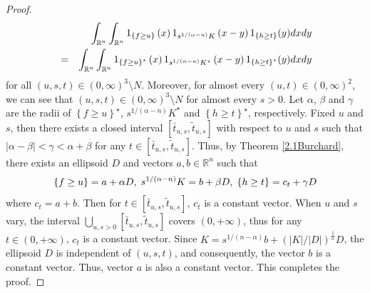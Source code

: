 \documentclass[preprint,12pt]{elsarticle}
\begin{document}
\begin{proof}
\begin{eqnarray}
	&&\int_{\mathbb{R}^n }  \int_{\mathbb{R}^n }1_{\left \{ f\ge u \right \} }\left ( x \right )1_{s^{1/(\alpha-n)  } K}\left ( x-y \right )  1_{\left \{ h\ge t \right \} }(y)dxdy\notag\\
	&=&\int_{\mathbb{R}^n }  \int_{\mathbb{R}^n }1_{\left \{ f\ge u \right \}^{\star }  }\left ( x \right )1_{s^{1/(\alpha-n)  } K^{\star }}\left ( x-y \right )  1_{\left \{ h\ge t \right \}^{\star }  }(y)dxdy\notag	 
\end{eqnarray}  
for all $\left ( u,s,t \right )\in \left ( 0,\infty  \right )^{3}\setminus N$. Moreover, for almost every $\left ( u,t \right ) \in \left ( 0,\infty  \right )^{2}$,  we can see that  $\left ( u,s,t \right )\in \left ( 0,\infty  \right )^{3}\setminus N $ for almost every $s> 0$. Let $\alpha$, $\beta$ and $\gamma$  are the radii of ${\left \{ f\ge u \right \}}^{\star}$, ${s^{1/(\alpha-n)}K}^{\star}$ and ${\left \{ h\ge t \right \}}^{\star}$, respectively. %
Fixed $u$ and $ s $, %
then there exists a closed interval $[{\bar{t}}_{u,s},{\tilde{t}}_{u,s}]$ with respect to $ u $ and $ s $ such that $ |\alpha-\beta| <\gamma<\alpha+\beta$ for any $t\in[{\bar{t}}_{u,s},{\tilde{t}}_{u,s}]$.  Thus, by Theorem \ref{2.1Burchard}, there exists an ellipsoid $D$ and vectors $a, b \in \mathbb{R}^n$ such that  
\begin{eqnarray}
	\left \{ f\ge u \right \}=a+\alpha D,\; s^{1/(\alpha-n)}K=b+\beta D,\; \left \{ h\ge t \right \}={c}_{t}+\gamma D\notag
\end{eqnarray}  
where ${c}_{t} = a + b$. Then for $t\in[{\bar{t}}_{u,s},{\tilde{t}}_{u,s}]$, ${c}_{t}$ is a constant vector. When $u$ and $s$ vary, the interval $\displaystyle\bigcup_{u,s>0} [{\bar{t}}_{u,s},{\tilde{t}}_{u,s}]$ covers $(0, +\infty)$, thus for any $t\in(0, +\infty)$, ${c}_{t}$ is a constant vector.  
Since $K = s^{1/(n-\alpha)}b + \left( \left| K \right| / \left| D \right| \right)^{\frac{1}{n}}D$, the ellipsoid $D$ is independent of $\left( u, s, t \right)$, and consequently, the vector $b$ is a constant vector. Thus, vector $a$ is also a constant vector. This completes the proof.
\end{proof}
\end{document}

